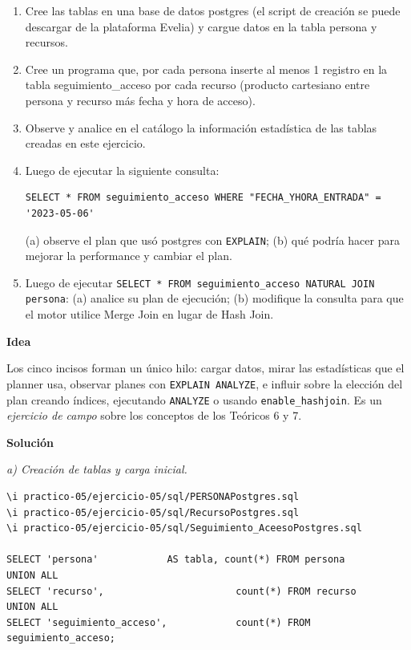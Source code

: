 \documentclass[11pt,a4paper]{article}
\newcommand{\itemcabecera}[1]{\noindent\textbf{#1}\par\medskip}
\newcommand{\bloqueIdea}{\itemcabecera{Idea}}
\newcommand{\bloqueSolucion}{\itemcabecera{Soluci\'on}}
\begin{document}
\begin{enumerate}[label=\alph*),leftmargin=*]
    \item Cree las tablas en una base de datos postgres (el script de creación se puede descargar de la plataforma Evelia) y cargue datos en la tabla persona y recursos.
    \item Cree un programa que, por cada persona inserte al menos 1 registro en la tabla seguimiento\_acceso por cada recurso (producto cartesiano entre persona y recurso más fecha y hora de acceso).
    \item Observe y analice en el catálogo la información estadística de las tablas creadas en este ejercicio.
    \item Luego de ejecutar la siguiente consulta:
\begin{lstlisting}
SELECT * FROM seguimiento_acceso WHERE "FECHA_YHORA_ENTRADA" = '2023-05-06'
\end{lstlisting}
    (a) observe el plan que usó postgres con \texttt{EXPLAIN}; (b) qué podría hacer para mejorar la performance y cambiar el plan.
    \item Luego de ejecutar \texttt{SELECT * FROM seguimiento\_acceso NATURAL JOIN persona}: (a) analice su plan de ejecución; (b) modifique la consulta para que el motor utilice Merge Join en lugar de Hash Join.
\end{enumerate}

\bloqueIdea

Los cinco incisos forman un único hilo: cargar datos, mirar las estadísticas que el planner usa, observar planes con \texttt{EXPLAIN ANALYZE}, e influir sobre la elección del plan creando índices, ejecutando \texttt{ANALYZE} o usando \texttt{enable\_hashjoin}. Es un \emph{ejercicio de campo} sobre los conceptos de los Teóricos 6 y 7.

\bloqueSolucion

\textit{a) Creación de tablas y carga inicial.}

\begin{lstlisting}
\i practico-05/ejercicio-05/sql/PERSONAPostgres.sql
\i practico-05/ejercicio-05/sql/RecursoPostgres.sql
\i practico-05/ejercicio-05/sql/Seguimiento_AceesoPostgres.sql

SELECT 'persona'            AS tabla, count(*) FROM persona
UNION ALL
SELECT 'recurso',                       count(*) FROM recurso
UNION ALL
SELECT 'seguimiento_acceso',            count(*) FROM seguimiento_acceso;
\end{lstlisting}
\end{document}
